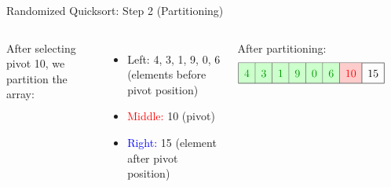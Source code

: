 \begin{frame}{Randomized Quicksort: Step 2 (Partitioning)}
  \begin{columns}[t]
    After selecting pivot 10, we partition the array:
    \begin{itemize}
      \item \textcolor{green!60!black}{Left:} 4, 3, 1, 9, 0, 6 (elements before pivot position)
      \item \textcolor{red}{Middle:} 10 (pivot)
      \item \textcolor{blue}{Right:} 15 (element after pivot position)
    \end{itemize}
    After partitioning:
    \[
      \renewcommand{\arraystretch}{1.5}
      \begin{array}{|c|c|c|c|c|c|c|c|}
        \hline
        \cellcolor{green!20}\textcolor{green!60!black}{4} & \cellcolor{green!20}\textcolor{green!60!black}{3} & \cellcolor{green!20}\textcolor{green!60!black}{1} & \cellcolor{green!20}\textcolor{green!60!black}{9} & \cellcolor{green!20}\textcolor{green!60!black}{0} & \cellcolor{green!20}\textcolor{green!60!black}{6} & \cellcolor{red!20}\textcolor{red}{10} & 15 \\
        \hline
      \end{array}
    \]
    \begin{minipage}[t]{\linewidth}
      \vspace{0pt}
      \begin{center}
      \end{center}
    \end{minipage}
  \end{columns}
\end{frame}

